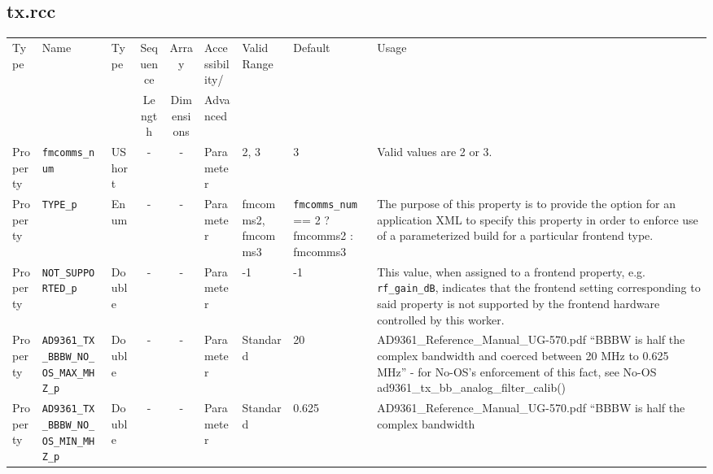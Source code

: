 \documentclass{article}
\def\comp{tx}
\begin{document}
\begin{landscape}
	\subsection*{\comp.rcc}
	\begin{scriptsize}
		\begin{longtable}{|p{1.8cm}|p{4.1cm}|p{1cm}|c|c|p{1.6cm}|p{3.7cm}|p{3.7cm}|p{2.5cm}|}
			\hline
			\rowcolor{blue}
			Type         & Name                                & Type & Sequence & Array      & Accessibility/ & Valid Range  & Default & Usage                                                                                                                                                                                                                       \\
			\rowcolor{blue}
			             &                                     &      & Length   & Dimensions & Advanced       &              &         &                                                                                                                                                                                                                             \\
			\hline
			Property     & \verb+fmcomms_num+                   & UShort &-        & -          & Parameter & 2, 3 & 3 & Valid values are 2 or 3.\\
			\hline
			Property     & \verb+TYPE_p+                   & Enum &-        & -          & Parameter & fmcomms2, fmcomms3 & \verb+fmcomms_num+ == 2 ? fmcomms2 : fmcomms3 & The purpose of this property is to provide the option for     an application XML to specify this property in order to enforce use of a parameterized build for a     particular frontend type.\\
			\hline
			Property     & \verb+NOT_SUPPORTED_p+                   & Double&-        & -          & Parameter & -1 & -1 & This value, when assigned to a frontend property, e.g. \verb+rf_gain_dB+, indicates that the frontend setting corresponding to said property is not supported by the frontend hardware controlled by this worker.
			 \\
			\hline
			Property     & \verb+AD9361_TX_BBBW_NO_OS_MAX_MHZ_p+ & Double & -       & -          & Parameter & Standard & 20 & AD9361\_Reference\_Manual\_UG-570.pdf ``BBBW is half the complex bandwidth
        and coerced between 20 MHz to 0.625 MHz'' - for No-OS's enforcement of
        this fact, see No-OS ad9361\_tx\_bb\_analog\_filter\_calib()  \\
			\hline
			Property     & \verb+AD9361_TX_BBBW_NO_OS_MIN_MHZ_p+ & Double & -       & -          & Parameter & Standard & 0.625 & AD9361\_Reference\_Manual\_UG-570.pdf ``BBBW is half the complex bandwidth

\end{longtable}
\end{scriptsize}
\end{landscape}
\end{document}
